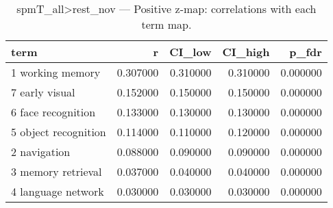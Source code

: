 \begin{table}
\caption{spmT_all>rest_nov — Positive z-map: correlations with each term map.}
\label{tab:spmT_all>rest_nov_pos}
\begin{tabular}{lrrrr}
\toprule
term & r & CI\_low & CI\_high & p\_fdr \\
\midrule
1 working memory & 0.307000 & 0.310000 & 0.310000 & 0.000000 \\
7 early visual & 0.152000 & 0.150000 & 0.150000 & 0.000000 \\
6 face recognition & 0.133000 & 0.130000 & 0.130000 & 0.000000 \\
5 object recognition & 0.114000 & 0.110000 & 0.120000 & 0.000000 \\
2 navigation & 0.088000 & 0.090000 & 0.090000 & 0.000000 \\
3 memory retrieval & 0.037000 & 0.040000 & 0.040000 & 0.000000 \\
4 language network & 0.030000 & 0.030000 & 0.030000 & 0.000000 \\
\bottomrule
\end{tabular}
\end{table}
